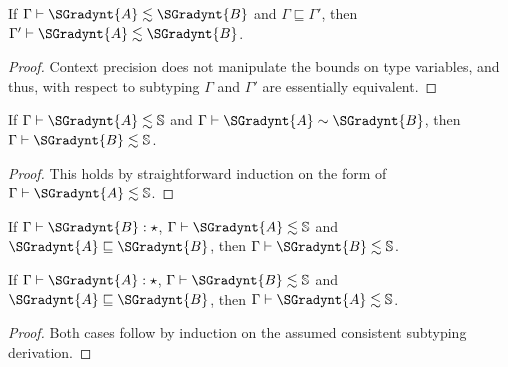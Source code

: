 \begin{lemma}
  \label{lemma:subtyping_context_precision}
  If $ \Gamma  \vdash  \SGradynt{A}  \lesssim  \SGradynt{B} $ and $ \Gamma  \sqsubseteq  \Gamma' $, then $ \Gamma'  \vdash  \SGradynt{A}  \lesssim  \SGradynt{B} $.
\end{lemma}
\begin{proof}
  Context precision does not manipulate the bounds on type variables, and thus,
  with respect to subtyping $\Gamma$ and $\Gamma'$ are essentially equivalent.
\end{proof}

\begin{lemma}
  \label{lemma:simply_typed_consistent_types_are_subtypes}
  If $ \Gamma  \vdash  \SGradynt{A}  \lesssim   \mathbb{S}  $ and $ \Gamma  \vdash  \SGradynt{A}  \sim  \SGradynt{B} $, then $ \Gamma  \vdash  \SGradynt{B}  \lesssim   \mathbb{S}  $.
\end{lemma}
\begin{proof}
  This holds by straightforward induction on the form of $ \Gamma  \vdash  \SGradynt{A}  \lesssim   \mathbb{S}  $.
\end{proof}

\begin{lemma}
  \label{lemma:type_precision_preserves_SL}
  \begin{enumR}
  \item[]
  \item If $ \Gamma  \vdash  \SGradynt{B}  : \star $, $ \Gamma  \vdash  \SGradynt{A}  \lesssim   \mathbb{S}  $ and $ \SGradynt{A}  \sqsubseteq  \SGradynt{B} $, then $ \Gamma  \vdash  \SGradynt{B}  \lesssim   \mathbb{S}  $.
  \item If $ \Gamma  \vdash  \SGradynt{A}  : \star $, $ \Gamma  \vdash  \SGradynt{B}  \lesssim   \mathbb{S}  $ and $ \SGradynt{A}  \sqsubseteq  \SGradynt{B} $, then $ \Gamma  \vdash  \SGradynt{A}  \lesssim   \mathbb{S}  $.
  \end{enumR}
\end{lemma}
\begin{proof}
  Both cases follow by induction on the assumed consistent subtyping
  derivation.
\end{proof}

